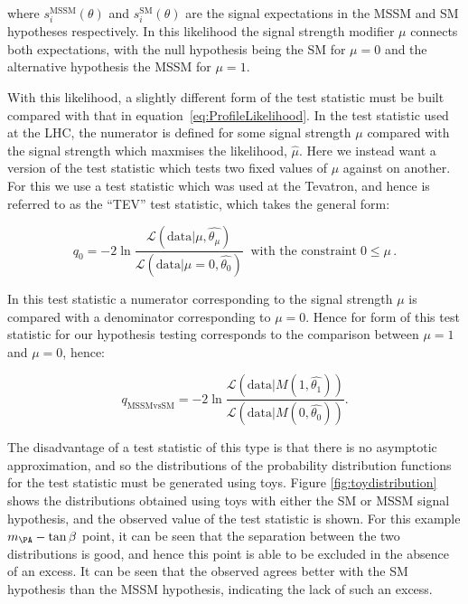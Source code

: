 where $s_{i}^{\text{MSSM}}(\theta)$ and $s_{i}^{\text{SM}}(\theta)$ are the
signal expectations in the \ac{MSSM} and \ac{SM} hypotheses respectively. In
this likelihood the signal strength modifier $\mu$ connects both expectations,
with the null hypothesis being the \ac{SM} for $\mu=0$ and the alternative
hypothesis the \ac{MSSM} for $\mu=1$. 

With this likelihood, a slightly different form of the test statistic must be
built compared with that in equation~\ref{eq:ProfileLikelihood}. In the test
statistic used at the \ac{LHC}, the numerator is defined for some signal
strength $\mu$ compared with the signal strength which maxmises the likelihood,
$\hat{\mu}$. Here we instead want a version of the test statistic which tests
two fixed values of $\mu$ against on another. For this we use a test statistic
which was used at the Tevatron, and hence is referred to as the ``TEV'' test
statistic, which takes the general form:

\begin{equation}
q_{0} = -2\ln\frac{\mathcal{L}(\text{data}| \mu,\hat{\theta_{\mu}} ) }
{\mathcal{L}(\text{data}|\mu=0,\hat{\theta_{0}})}
\;\; \text{with the constraint} \; 0\leq\mu\, .
\end{equation}

In this test statistic a numerator corresponding to the signal strength $\mu$ is
compared with a denominator corresponding to $\mu=0$. Hence for form of this
test statistic for our hypothesis testing corresponds to the comparison between
$\mu=1$ and $\mu=0$, hence:

\begin{equation}
q_{\text{MSSMvsSM}} = -2\ln\frac{\mathcal{L}(\text{data}| M(1,\hat{\theta_{1}}) ) }
{\mathcal{L}(\text{data}| M(0,\hat{\theta_{0}}) )}.
\label{eq:qMSSMvsSM}
\end{equation}

The disadvantage of a test statistic of this type is that there is no asymptotic
approximation, and so the distributions of the probability distribution
functions for the test statistic must be generated using toys. Figure
\ref{fig:toydistribution} shows the distributions obtained using toys with
either the \ac{SM} or \ac{MSSM} signal hypothesis, and the observed value of the
test statistic is shown. For this example $m_{\PA}-\tan\beta$ point, it can be
seen that the separation between the two distributions is good, and hence this
point is able to be excluded in the absence of an excess. It can be seen that
the observed agrees better with the \ac{SM} hypothesis than the \ac{MSSM}
hypothesis, indicating the lack of such an excess. 

